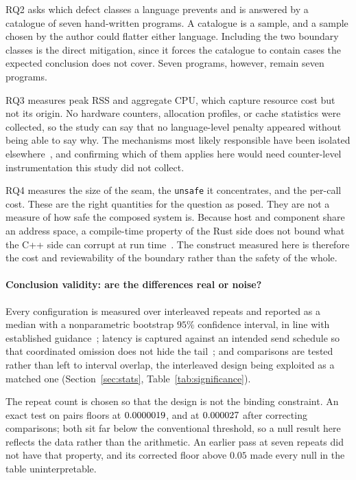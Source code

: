 \documentclass[english,twoside,openright,a4paper,censored,csm,software-track-2020]{HYthesisML}
\begin{document}
RQ2 asks which defect classes a language prevents and is answered by a catalogue of seven
hand-written programs. A catalogue is a sample, and a sample chosen by the author could flatter
either language. Including the two boundary classes is the direct mitigation, since it forces the
catalogue to contain cases the expected conclusion does not cover. Seven programs, however,
remain seven programs.

RQ3 measures peak RSS and aggregate CPU, which capture resource cost but not its origin. No
hardware counters, allocation profiles, or cache statistics were collected, so the study can say
that no language-level penalty appeared without being able to say why. The mechanisms most likely
responsible have been isolated elsewhere~\cite{zhang2022runtime,harris2023morello}, and
confirming which of them applies here would need counter-level instrumentation this study did not
collect.

RQ4 measures the size of the seam, the \texttt{unsafe} it concentrates, and the per-call cost.
These are the right quantities for the question as posed. They are not a measure of how safe the
composed system is. Because host and component share an address space, a compile-time property of
the Rust side does not bound what the C++ side can corrupt at run
time~\cite{rivera2021galeed,kirth2022pkrusafe}. The construct measured here is therefore the cost
and reviewability of the boundary rather than the safety of the whole.

\paragraph{Conclusion validity: are the differences real or noise?}
Every configuration is measured over \NRepeats{} interleaved repeats and reported as a median
with a nonparametric bootstrap $95\%$ confidence interval, in line with established
guidance~\cite{georges2007rigorous}; latency is captured against an intended send schedule so
that coordinated omission does not hide the
tail~\cite{schroeder2006openclosed,tene_hdrhistogram}; and comparisons are tested rather than
left to interval overlap, the interleaved design being exploited as a matched one
(Section~\ref{sec:stats}, Table~\ref{tab:significance}).

The repeat count is chosen so that the design is not the binding constraint. An exact test on
\NRepeats{} pairs floors at $0.0000019$, and at $0.000027$ after correcting
\NTests{} comparisons; both sit far below the conventional threshold, so a null result here
reflects the data rather than the arithmetic. An earlier pass at seven repeats did not have
that property, and its corrected floor above $0.05$ made every null in the table
uninterpretable.
\end{document}
